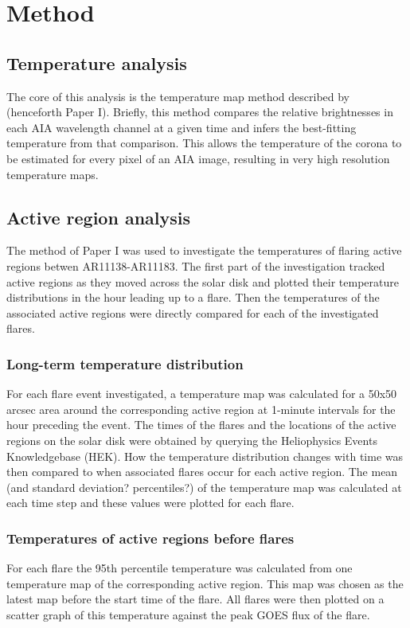 \documentclass{article}
\begin{document}
\section{Method}
\subsection{Temperature analysis}
The core of this analysis is the temperature map method described by \cite{Leonard2014} (henceforth Paper I).
Briefly, this method compares the relative brightnesses in each AIA wavelength channel at a given time and infers the best-fitting temperature from that comparison.
This allows the temperature of the corona to be estimated for every pixel of an AIA image, resulting in very high resolution temperature maps.

\subsection{Active region analysis}
The method of Paper I was used to investigate the temperatures of flaring active regions betwen AR11138-AR11183. %
The first part of the investigation tracked active regions as they moved across the solar disk and plotted their temperature distributions in the hour leading up to a flare.
Then the temperatures of the associated active regions were directly compared for each of the investigated flares.

\subsubsection{Long-term temperature distribution}
For each flare event investigated, a temperature map was calculated for a 50x50 arcsec area around the corresponding active region at 1-minute intervals for the hour preceding the event.
The times of the flares and the locations of the active regions on the solar disk were obtained by querying the Heliophysics Events Knowledgebase (HEK).
How the temperature distribution changes with time was then compared to when associated flares occur for each active region.
The mean (and standard deviation? percentiles?) of the temperature map was calculated at each time step and these values were plotted for each flare.

\subsubsection{Temperatures of active regions before flares}
For each flare the 95th percentile temperature was calculated from one temperature map of the corresponding active region.
This map was chosen as the latest map before the start time of the flare. %
All flares were then plotted on a scatter graph of this temperature against the peak GOES flux of the flare.
\end{document}
